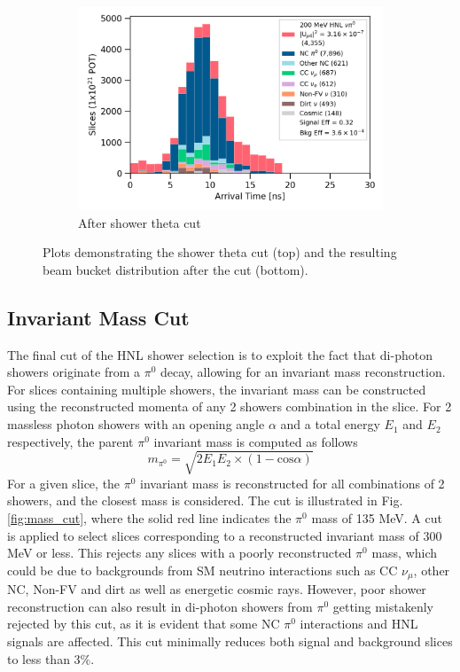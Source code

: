 \begin{figure}[h!]
\begin{subfigure}[b]{0.495\textwidth}
            \includegraphics[width=\textwidth]{beam_bucket_postshowertheta}
            \caption{After shower theta cut}%
	    \label{fig:bb_theta}
        \end{subfigure}
        \caption{
		Plots demonstrating the shower theta cut (top) and the resulting beam bucket distribution after the cut (bottom). 
	}
        \label{fig:theta_cut}
\end{figure}

\subsection{Invariant Mass Cut}

The final cut of the HNL shower selection is to exploit the fact that di-photon showers originate from a $\pi^0$ decay, allowing for an invariant mass reconstruction.
For slices containing multiple showers, the invariant mass can be constructed using the reconstructed momenta of any 2 showers combination in the slice.
For 2 massless photon showers with an opening angle $\alpha$ and a total energy $E_1$ and $E_2$ respectively, the parent $\pi^0$ invariant mass is computed as follows
\begin{equation}
	m_{\pi^0} = \sqrt{2 E_1 E_2 \times (1 - \mbox{cos}\alpha)}
\end{equation}
For a given slice, the $\pi^0$ invariant mass is reconstructed for all combinations of 2 showers, and the closest mass is considered.
The cut is illustrated in Fig. \ref{fig:mass_cut}, where the solid red line indicates the $\pi^0$ mass of 135 MeV.
A cut is applied to select slices corresponding to a reconstructed invariant mass of 300 MeV or less.
This rejects any slices with a poorly reconstructed $\pi^0$ mass, which could be due to backgrounds from 
SM neutrino interactions such as CC $\nu_\mu$, other NC, Non-FV and dirt as well as energetic cosmic rays.
However, poor shower reconstruction can also result in di-photon showers from $\pi^0$ getting mistakenly rejected by this cut, as it is evident that some NC $\pi^0$ interactions and HNL signals are affected.
This cut minimally reduces both signal and background slices to less than $3 \%$.

